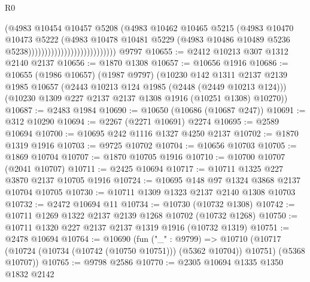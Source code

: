 \begin{lexlean}{R0}
\begin{coremodule}
                                                (@4983
                                                  @10454
                                                  @10457
                                                  @5208
                                                  (@4983
                                                    @10462
                                                    @10465
                                                    @5215
                                                    (@4983
                                                      @10470
                                                      @10473
                                                      @5222
                                                      (@4983
                                                        @10478
                                                        @10481
                                                        @5229
                                                        (@4983
                                                          @10486
                                                          @10489
                                                          @5236
                                                          @5238)))))))))))))))))))))))))))
    @9797
@10655 := @2412 @10213 @307 @1312 @2140 @2137
@10656 := @1870 @1308
@10657 := @10656 @1916
@10686 := @10655
    (@1986 @10657)
    (@1987 @9797)
    (@10230
      @142
      @1311
      @2137
      @2139
      @1985
      @10657
      (@2443 @10213 @124 @1985 (@2448 (@2449 @10213 @124)))
      (@10230 @1309 @227 @2137 @2137 @1308 @1916 (@10251 @1308) @10270))
@10687 := @2483 @1984
@10690 := @10650 (@10686 (@10687 @247))
@10691 := @312 @10290
@10694 := @2267 (@2271 @10691) @2274
@10695 := @2589 @10694
@10700 := @10695 @242 @1116 @1327 @4250 @2137
@10702 := @1870 @1319 @1916
@10703 := @9725 @10702
@10704 := @10656 @10703
@10705 := @1869 @10704
@10707 := @1870 @10705 @1916
@10710 := @10700 @10707 (@2041 @10707)
@10711 := @2425 @10694
@10717 := @10711 @1325 @227 @3870 @2137 @10705 @1916
@10724 := @10695 @148 @97 @1324 @3868 @2137 @10704 @10705
@10730 := @10711 @1309 @1323 @2137 @2140 @1308 @10703
@10732 := @2472 @10694 @11
@10734 := @10730 (@10732 @1308)
@10742 := @10711 @1269 @1322 @2137 @2139 @1268 @10702 (@10732 @1268)
@10750 := @10711 @1320 @227 @2137 @2137 @1319 @1916 (@10732 @1319)
@10751 := @2478 @10694
@10764 := @10690
    (fun ("_" : @9799) =>
    @10710 (@10717 (@10724 (@10734 (@10742 (@10750 @10751))) (@5362 @10704)) @10751) (@5368 @10707))
@10765 := @9798 @2586
@10770 := @2305 @10694 @1335 @1350 @1832 @2142

\end{coremodule}
\end{lexlean}
